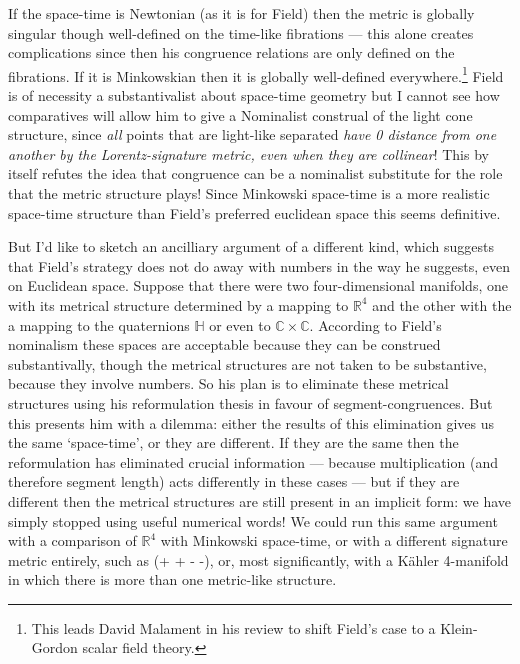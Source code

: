 \documentclass[11pt,oneside,a4paper]{article}
\begin{document}
If the space-time is Newtonian (as it is for Field) then the metric is globally singular though well-defined on the time-like fibrations --- this alone creates complications since then his congruence relations are only defined on the fibrations. If it is Minkowskian then it is globally well-defined everywhere.\footnote{This leads David Malament in his review \parencite*{malament_science_1982} to shift Field's case to a Klein-Gordon scalar field theory.} Field is of necessity a substantivalist about space-time geometry but I cannot see how comparatives will allow him to give a Nominalist construal of the light cone structure, since \textit{all} points that are light-like separated \emph{have 0 distance from one another by the Lorentz-signature metric, even when they are collinear}!  This by itself refutes the idea that congruence can be a nominalist substitute for the role that the metric structure plays! Since Minkowski space-time is a more realistic space-time structure than Field's preferred euclidean space this seems definitive.

But I'd like to sketch an ancilliary argument of a different kind, which suggests that Field's strategy does not do away with numbers in the way he suggests, even on Euclidean space. Suppose that there were two four-dimensional manifolds, one with its metrical structure determined by a mapping to $\mathbb{R}^{4}$ and the other with the a mapping to the quaternions $\mathbb{H}$ or even to $\mathbb{C} \times \mathbb{C}$. According to Field's nominalism these spaces are acceptable because they can be construed substantivally, though the metrical structures are not taken to be substantive, because they involve numbers. So his plan is to eliminate these metrical structures using his reformulation thesis in favour of segment-congruences. But this presents him with a dilemma: either the results of this elimination gives us the same `space-time', or they are different. If they are the same then the reformulation has eliminated crucial information --- because multiplication (and therefore segment length) acts differently in these cases --- but if they are different then the metrical structures are still present in an implicit form: we have simply stopped using useful numerical words! We could run this same argument with a comparison of $\mathbb{R}^{4}$ with Minkowski space-time, or with a different signature metric entirely, such as (+ + - -), or, most significantly, with a Kähler 4-manifold in which there is more than one metric-like structure. 
\end{document}

